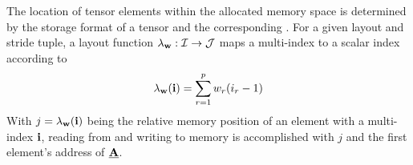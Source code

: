 The location of tensor elements within the allocated memory space is determined by the storage format of a tensor and the corresponding  .
For a given layout and stride tuple, a layout function $\lambda_{\mathbf{w}} : \mathcal{I} \rightarrow \mathcal{J}$ maps a multi-index to a scalar index according to 
\begin{equation}
\label{equ:lambda}
\lambda_{\mathbf{w}}(\mathbf{i}) = \sum_{r=1}^p w_r (i_r-1)
\end{equation}
With $j = \lambda_{\mathbf{w}} (\mathbf{i})$ being the relative memory position of an element with a multi-index $\mathbf{i}$, reading from and writing to memory is accomplished with $j$ and the first element's address of $\underline{\mathbf{A}}$.

%


